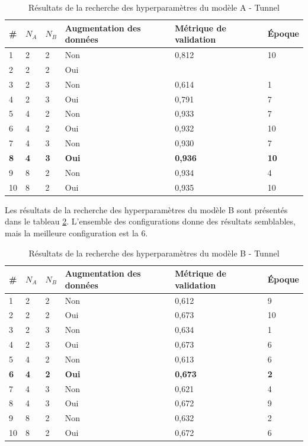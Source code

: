     \begin{table}[H]
        \centering
        \caption{Résultats de la recherche des hyperparamètres du modèle A - Tunnel}
        \label{tab:resultat_tunnel_modele_a}
        \begin{tabular}{lllp{3cm}p{3cm}l}
            \midrule
            \# & \(N_A\) & \(N_B\) & Augmentation des données & Métrique de validation & Époque\\
            \midrule\midrule
            1  & 2 & 2 & Non & 0,812 & 10\\
            2  & 2 & 2 & Oui & \\
            3  & 2 & 3 & Non & 0,614 & 1\\
            4  & 2 & 3 & Oui & 0,791 & 7\\
            5  & 4 & 2 & Non & 0,933 & 7\\
            6  & 4 & 2 & Oui & 0,932 & 10\\
            7  & 4 & 3 & Non & 0,930 & 7\\
            \textbf{8}  & \textbf{4} & \textbf{3} & \textbf{Oui} & \textbf{0,936} & \textbf{10}\\
            9  & 8 & 2 & Non & 0,934 & 4\\
            10 & 8 & 2 & Oui & 0,935 & 10\\
            \midrule
        \end{tabular}
    \end{table}

    Les résultats de la recherche des hyperparamètres du modèle B sont présentés dans le tableau \ref{tab:resultat_tunnel_modele_b}. L'ensemble des configurations donne des résultats semblables, mais la meilleure configuration est la 6.

    \begin{table}[H]
        \centering
        \caption{Résultats de la recherche des hyperparamètres du modèle B - Tunnel}
        \label{tab:resultat_tunnel_modele_b}
        \begin{tabular}{lllp{3cm}p{3cm}l}
            \midrule
            \# & \(N_A\) & \(N_B\) & Augmentation des données & Métrique de validation & Époque\\
            \midrule\midrule
            1  & 2 & 2 & Non & 0,612 & 9\\
            2  & 2 & 2 & Oui & 0,673 & 10\\
            3  & 2 & 3 & Non & 0,634 & 1\\
            4  & 2 & 3 & Oui & 0,673 & 6\\
            5  & 4 & 2 & Non & 0,613 & 6\\
            \textbf{6}  & \textbf{4} & \textbf{2} & \textbf{Oui} & \textbf{0,673} & \textbf{2}\\
            7  & 4 & 3 & Non & 0,621 & 4\\
            8  & 4 & 3 & Oui & 0,672 & 9\\
            9  & 8 & 2 & Non & 0,632 & 2\\
            10 & 8 & 2 & Oui & 0,672 & 6\\
            \midrule
        \end{tabular}
    \end{table}

